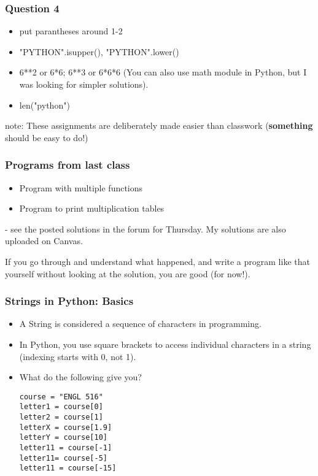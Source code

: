 \documentclass{beamer}
\begin{document}
\begin{frame}
\frametitle{Question 4}
\begin{itemize}
\item put parantheses around 1-2
\item "PYTHON".isupper(), "PYTHON".lower()
\item 6**2 or 6*6; 6**3 or 6*6*6 (You can also use math module in Python, but I was looking for simpler solutions).
\item len("python")
\end{itemize}
note: These assignments are deliberately made easier than classwork (\textbf{something} should be easy to do!)
\end{frame}

\begin{frame}[fragile]
\frametitle{Programs from last class}
\begin{itemize}
\item Program with multiple functions
\item Program to print multiplication tables
\end{itemize}
- see the posted solutions in the forum for Thursday. My solutions are also uploaded on Canvas.

\bigskip

If you go through and understand what happened, and write a program like that yourself without looking at the solution, you are good (for now!). 
\end{frame}

\begin{frame}[fragile]
\frametitle{Strings in Python: Basics} \small
\begin{itemize} 
\item A String is considered a sequence of characters in programming. 
\item In Python, you use square brackets to access individual characters in a string (indexing starts with 0, not 1). \pause
\item What do the following give you? 
\begin{verbatim}
course = "ENGL 516"
letter1 = course[0]
letter2 = course[1]
letterX = course[1.9] 
letterY = course[10] 
letter11 = course[-1]
letter11= course[-5]
letter11 = course[-15]
\end{verbatim} \pause 
\end{itemize}
\end{frame}
\end{document}
